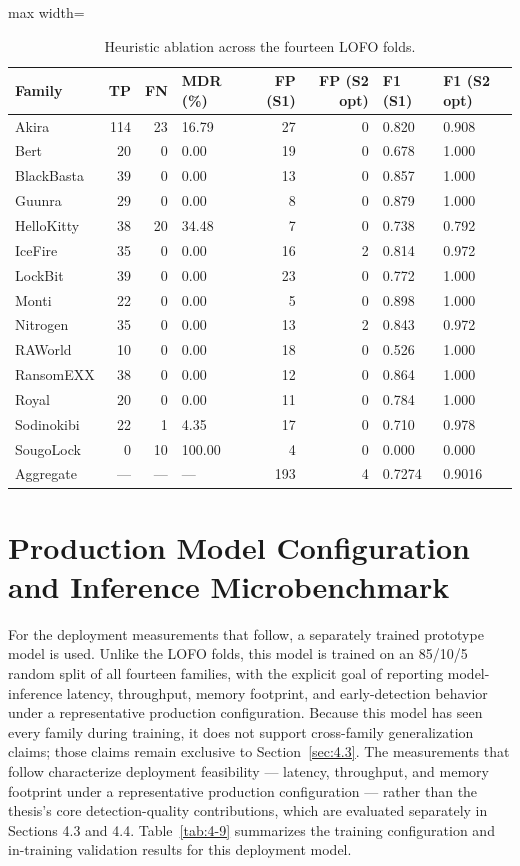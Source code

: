 \begin{table}[htbp]
\centering
\caption{Heuristic ablation across the fourteen LOFO folds.}\label{tab:4-8}
\begin{adjustbox}{max width=\textwidth}
\footnotesize
\begin{tabular}{lrrlrrll}
\hline
\textbf{Family} & \textbf{TP} & \textbf{FN} & \textbf{MDR (\%)} & \textbf{FP (S1)} & \textbf{FP (S2 opt)} & \textbf{F1 (S1)} & \textbf{F1 (S2 opt)} \\
\hline
Akira & 114 & 23 & 16.79 & 27 & 0 & 0.820 & 0.908 \\
Bert & 20 & 0 & 0.00 & 19 & 0 & 0.678 & 1.000 \\
BlackBasta & 39 & 0 & 0.00 & 13 & 0 & 0.857 & 1.000 \\
Guunra & 29 & 0 & 0.00 & 8 & 0 & 0.879 & 1.000 \\
HelloKitty & 38 & 20 & 34.48 & 7 & 0 & 0.738 & 0.792 \\
IceFire & 35 & 0 & 0.00 & 16 & 2 & 0.814 & 0.972 \\
LockBit & 39 & 0 & 0.00 & 23 & 0 & 0.772 & 1.000 \\
Monti & 22 & 0 & 0.00 & 5 & 0 & 0.898 & 1.000 \\
Nitrogen & 35 & 0 & 0.00 & 13 & 2 & 0.843 & 0.972 \\
RAWorld & 10 & 0 & 0.00 & 18 & 0 & 0.526 & 1.000 \\
RansomEXX & 38 & 0 & 0.00 & 12 & 0 & 0.864 & 1.000 \\
Royal & 20 & 0 & 0.00 & 11 & 0 & 0.784 & 1.000 \\
Sodinokibi & 22 & 1 & 4.35 & 17 & 0 & 0.710 & 0.978 \\
SougoLock & 0 & 10 & 100.00 & 4 & 0 & 0.000 & 0.000 \\
Aggregate & --- & --- & --- & 193 & 4 & 0.7274 & 0.9016 \\
\hline
\end{tabular}
\end{adjustbox}
\end{table}

\section{Production Model Configuration and Inference Microbenchmark}\label{sec:4.7}

For the deployment measurements that follow, a separately trained prototype model is used. Unlike the LOFO folds, this model is trained on an 85/\allowbreak{}10/\allowbreak{}5 random split of all fourteen families, with the explicit goal of reporting model-inference latency, throughput, memory footprint, and early-detection behavior under a representative production configuration. Because this model has seen every family during training, it does not support cross-family generalization claims; those claims remain exclusive to Section~\ref{sec:4.3}. The measurements that follow characterize deployment feasibility --- latency, throughput, and memory footprint under a representative production configuration --- rather than the thesis's core detection-quality contributions, which are evaluated separately in Sections 4.3 and 4.4. Table~\ref{tab:4-9} summarizes the training configuration and in-training validation results for this deployment model.

